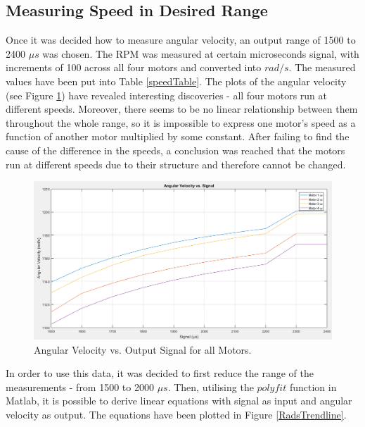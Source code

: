 \subsection{Measuring Speed in Desired Range}
Once it was decided how to measure angular velocity, an output range of 1500 to 2400 $\mu s$ was chosen. The RPM was measured at certain microseconds signal, with increments of 100 across all four motors and converted into $rad/s$. The measured values have been put into Table \ref{speedTable}.
The plots of the angular velocity (see Figure \ref{radsPlots}) have revealed interesting discoveries - all four motors run at different speeds. Moreover, there seems to be no linear relationship between them throughout the whole range, so it is impossible to express one motor's speed as a function of another motor multiplied by some constant. After failing to find the cause of the difference in the speeds, a conclusion was reached that the motors run at different speeds due to their structure and therefore cannot be changed.

\begin{figure}[H]
  \centering
    \includegraphics[width=1\textwidth]{images/radsPlots.png}
	\caption{Angular Velocity vs. Output Signal for all Motors.}
	\label{radsPlots}
\end{figure}

In order to use this data, it was decided to first reduce the range of the measurements - from 1500 to 2000 $\mu s$. Then, utilising the $polyfit$ function in Matlab, it is possible to derive linear equations with signal as input and angular velocity as output. The equations have been plotted in Figure \ref{RadsTrendline}.

